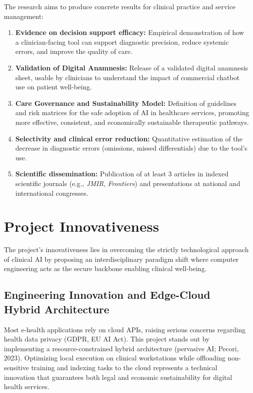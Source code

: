 \documentclass[11pt,a4paper]{article}
\begin{document}
The research aims to produce concrete results for clinical practice and service management:
\begin{enumerate}
    \item \textbf{Evidence on decision support efficacy:} Empirical demonstration of how a clinician-facing tool can support diagnostic precision, reduce systemic errors, and improve the quality of care.
    \item \textbf{Validation of Digital Anamnesis:} Release of a validated digital anamnesis sheet, usable by clinicians to understand the impact of commercial chatbot use on patient well-being.
    \item \textbf{Care Governance and Sustainability Model:} Definition of guidelines and risk matrices for the safe adoption of AI in healthcare services, promoting more effective, consistent, and economically sustainable therapeutic pathways.
    \item \textbf{Selectivity and clinical error reduction:} Quantitative estimation of the decrease in diagnostic errors (omissions, missed differentials) due to the tool's use.
    \item \textbf{Scientific dissemination:} Publication of at least 3 articles in indexed scientific journals (e.g., \textit{JMIR}, \textit{Frontiers}) and presentations at national and international congresses.
\end{enumerate}

\section{Project Innovativeness}

The project's innovativeness lies in overcoming the strictly technological approach of clinical AI by proposing an interdisciplinary paradigm shift where computer engineering acts as the secure backbone enabling clinical well-being.

\subsection{Engineering Innovation and Edge-Cloud Hybrid Architecture}
Most e-health applications rely on cloud APIs, raising serious concerns regarding health data privacy (GDPR, EU AI Act). This project stands out by implementing a resource-constrained hybrid architecture (pervasive AI; Pecori, 2023). Optimizing local execution on clinical workstations while offloading non-sensitive training and indexing tasks to the cloud represents a technical innovation that guarantees both legal and economic sustainability for digital health services.
\end{document}
